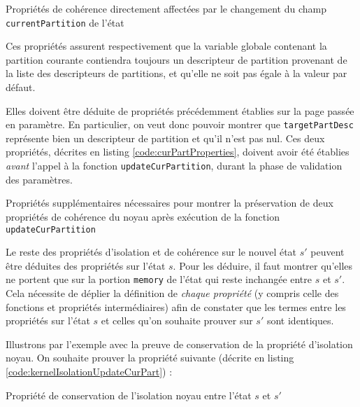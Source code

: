 			\begin{listing}[!ht]
				\caption{Propriétés de cohérence directement affectées par le changement du champ \texttt{currentPartition} de l'état}
				\label{code:consistencyCurPart}
			\end{listing}

			Ces propriétés assurent respectivement que la variable globale contenant la partition courante contiendra toujours un descripteur de partition provenant de la liste des descripteurs de partitions, et qu'elle ne soit pas égale à la valeur par défaut.

			Elles doivent être déduite de propriétés précédemment établies sur la page passée en paramètre. En particulier, on veut donc pouvoir montrer que \texttt{targetPartDesc} représente bien un descripteur de partition et qu'il n'est pas nul. Ces deux propriétés, décrites en listing \ref{code:curPartProperties}, doivent avoir été établies \emph{avant} l'appel à la fonction \texttt{updateCurPartition}, durant la phase de validation des paramètres.

			\begin{listing}[!ht]
				\caption{Propriétés supplémentaires nécessaires pour montrer la préservation de deux propriétés de cohérence du noyau après exécution de la fonction \texttt{updateCurPartition}}
				\label{code:curPartProperties}
			\end{listing}

			Le reste des propriétés d'isolation et de cohérence sur le nouvel état $s'$ peuvent être déduites des propriétés sur l'état $s$. Pour les déduire, il faut montrer qu'elles ne portent que sur la portion \texttt{memory} de l'état qui reste inchangée entre $s$ et $s'$. Cela nécessite de déplier la définition de \emph{chaque propriété} (y compris celle des fonctions et propriétés intermédiaires) afin de constater que les termes entre les propriétés sur l'état $s$ et celles qu'on souhaite prouver sur $s'$ sont identiques.

			Illustrons par l'exemple avec la preuve de conservation de la propriété d'isolation noyau. On souhaite prouver la propriété suivante (décrite en listing \ref{code:kernelIsolationUpdateCurPart}) : 

			\begin{listing}[!ht]
				\caption{Propriété de conservation de l'isolation noyau entre l'état $s$ et $s'$}
				\label{code:kernelIsolationUpdateCurPart}
			\end{listing}

